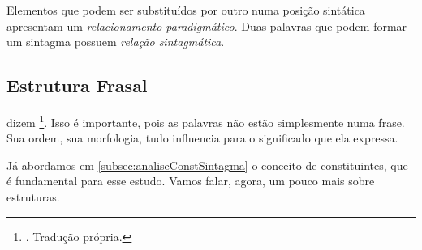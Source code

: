 \begin{center}

\end{center}

Elementos que podem ser substituídos por outro numa posição sintática apresentam um \textit{relacionamento paradigmático}. Duas palavras que podem formar um sintagma possuem \textit{relação sintagmática}.

\subsection{Estrutura Frasal}
\label{subsec:estrFrasal}

 dizem 
\footnote{. Tradução própria.}.
Isso é importante, pois as palavras não estão simplesmente  numa frase. Sua ordem, sua morfologia, tudo influencia para o significado que ela expressa.

Já abordamos em \ref{subsec:analiseConstSintagma} o conceito de constituintes, que é fundamental para esse estudo. Vamos falar, agora, um pouco mais sobre estruturas.

